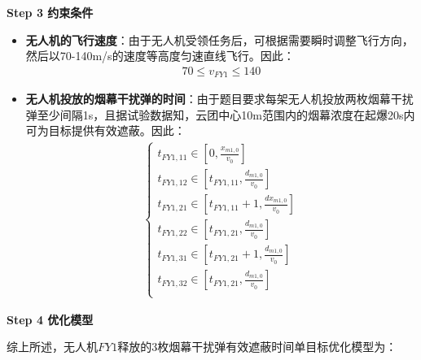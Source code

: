 \documentclass[../main.tex]{subfiles}
\begin{document}
\textbf{Step 3 约束条件}
\begin{itemize}
\item \textbf{无人机的飞行速度}：由于无人机受领任务后，可根据需要瞬时调整飞行方向，然后以70-140m/s的速度等高度匀速直线飞行。因此：
\begin{align}\label{15.8}
  70 \leq v_{FY1} \leq 140
\end{align}
\item \textbf{无人机投放的烟幕干扰弹的时间}：由于题目要求每架无人机投放两枚烟幕干扰弹至少间隔1s，且据试验数据知，云团中心10m范围内的烟幕浓度在起爆20s内可为目标提供有效遮蔽。因此：
\begin{align}
\begin{cases}
t_{FY1,11}\in \left[ 0,\frac{x_{m1,0}}{v_0} \right]\\
t_{FY1,12}\in \left[ t_{FY1,11},\frac{d_{m1,0}}{v_0} \right]\\
t_{FY1,21}\in \left[ t_{FY1,11}+1,\frac{dx_{m1,0}}{v_0} \right]\\
t_{FY1,22}\in \left[ t_{FY1,21},\frac{d_{m1,0}}{v_0} \right]\\
t_{FY1,31}\in \left[ t_{FY1,21}+1,\frac{d_{m1,0}}{v_0} \right]\\
t_{FY1,32}\in \left[ t_{FY1,21},\frac{d_{m1,0}}{v_0} \right]\\
\end{cases}
\end{align}
\end{itemize}
\textbf{Step 4 优化模型}
\par 综上所述，无人机$FY1$释放的3枚烟幕干扰弹有效遮蔽时间单目标优化模型为：
\end{document}
